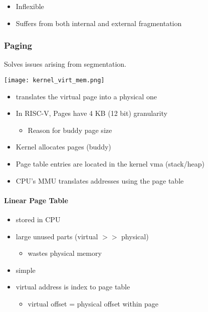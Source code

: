 \begin{itemize}
    \item Inflexible
    \item Suffers from both internal and external fragmentation
\end{itemize}

\subsubsection{Paging}
Solves issues arising from segmentation.

\begin{center}
    \texttt{[image: kernel\_virt\_mem.png]}
\end{center}

\begin{itemize}
    \item translates the virtual page into a physical one
    \item In RISC-V, Pages have 4 KB (12 bit) granularity
          \begin{itemize}
              \item Reason for buddy page size
          \end{itemize}
    \item Kernel allocates pages (buddy)
    \item Page table entries are located in the kernel vma (stack/heap)
    \item CPU's MMU translates addresses using the page table
\end{itemize}

\paragraph{Linear Page Table}
\begin{itemize}
    \item stored in CPU
    \item large unused parts (virtual $>>$ physical)
          \begin{itemize}
              \item wastes physical memory
          \end{itemize}
    \item simple
    \item virtual address is index to page table
          \begin{itemize}
              \item virtual offset = physical offset within page
          \end{itemize}
\end{itemize}


